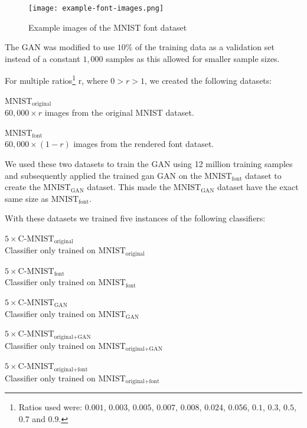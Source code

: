 \documentclass[10pt,twocolumn,letterpaper]{article}
\begin{document}
\begin{figure}[t]
\begin{center}
\texttt{[image: example-font-images.png]}%
\end{center}
   \caption{Example images of the MNIST font dataset}
\label{fig:example-font-images}
\end{figure}

The GAN was modified to use $10\%$ of the training data as a validation set instead of a constant $1,000$ samples as this allowed for smaller sample sizes.

For multiple ratios\footnote{ Ratios used were: $0.001$, $0.003$, $0.005$, $0.007$, $0.008$, $0.024$, $0.056$, $0.1$, $0.3$, $0.5$, $0.7$ and $0.9$. } r, where $0 > r > 1$, we created the following datasets:

\begin{description}
	\item{$\text{MNIST}_\text{original}$} \hfill \\ $60,000 \times r$ images from the original MNIST dataset.
	\item{$\text{MNIST}_\text{font}$} \hfill \\ $60,000 \times (1 - r)$ images from the rendered font dataset.
\end{description}

We used these two datasets to train the GAN using 12 million training samples and subsequently applied the trained gan GAN on the $\text{MNIST}_\text{font}$ dataset to create the $\text{MNIST}_\text{GAN}$ dataset. This made the $\text{MNIST}_\text{GAN}$ dataset have the exact same size as $\text{MNIST}_\text{font}$.


With these datasets we trained five instances of the following classifiers:

\begin{description}
	\item{$5\times \text{C-MNIST}_\text{original}$} \hfill \\ Classifier only trained on $\text{MNIST}_\text{original}$
	\item{$5\times \text{C-MNIST}_\text{font}$} \hfill \\ Classifier only trained on $\text{MNIST}_\text{font}$
	\item{$5\times \text{C-MNIST}_\text{GAN}$} \hfill \\ Classifier only trained on $\text{MNIST}_\text{GAN}$
	\item{$5\times \text{C-MNIST}_\text{original+GAN}$} \hfill \\ Classifier only trained on $\text{MNIST}_\text{original+GAN}$
	\item{$5\times \text{C-MNIST}_\text{original+font}$} \hfill \\ Classifier only trained on $\text{MNIST}_\text{original+font}$
\end{description}
\end{document}
